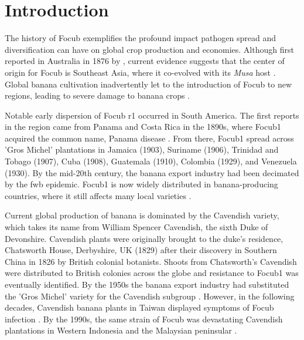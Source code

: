 
\section{Introduction}
\label{sec:chap2Intro}

The history of \acf{Focub} exemplifies the profound impact pathogen spread and diversification can have on global crop production and economies. Although first reported in Australia in 1876 by \textcite{Bancroft1876}, current evidence suggests that the center of origin for \ac{Focub} is Southeast Asia, where it co-evolved with its \textit{Musa} host \parencite{Maryani2019}. Global banana cultivation inadvertently let to the introduction of \ac{Focub} to new regions, leading to severe damage to banana crops \parencite{Kema2021}. 

Notable early dispersion of \acs{Focub} \acf{r1} occurred in South America. The first reports in the region came from Panama and Costa Rica in the 1890s, where \ac{Focub1} acquired the common name, Panama disease \parencite{Ashby1913}. From there, \ac{Focub1}  spread across 'Gros Michel' plantations in Jamaica (1903), Suriname (1906), Trinidad and Tobago (1907), Cuba (1908), Guatemala (1910), Colombia (1929), and Venezuela (1930). By the mid-20th century, the banana export industry had been decimated by the \ac{fwb} epidemic. \Ac{Focub1} is now widely distributed in banana-producing countries, where it still affects many local varieties \parencite{Dita2018}.

Current global production of banana is dominated by the Cavendish variety, which takes its name from William Spencer Cavendish, the sixth Duke of Devonshire. Cavendish plants were originally brought to the duke's residence, Chatsworth House, Derbyshire, UK (1829) after their discovery in Southern China in 1826 by British colonial botanists. Shoots from Chatsworth's Cavendish were distributed to British colonies across the globe and resistance to \ac{Focub1} was eventually identified. By the 1950s the banana export industry had substituted the 'Gros Michel' variety for the Cavendish subgroup \parencite{Ploetz2005, Dita2018}. However, in the following decades, Cavendish banana plants in Taiwan displayed symptoms of \ac{Focub} infection \parencite{Agrios2005}. By the 1990s, the same strain of \ac{Focub} was devastating Cavendish plantations in Western Indonesia and the Malaysian peninsular \parencite{Kema2021}. 

